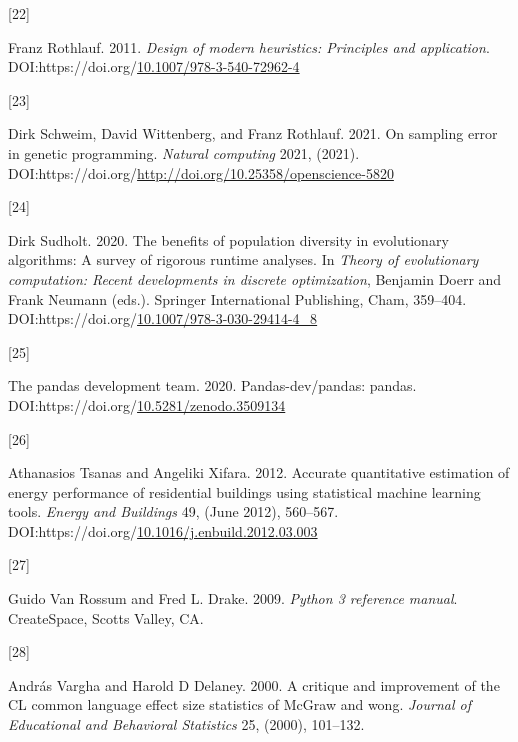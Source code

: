\documentclass[
  11pt,
]{article}
\newlength{\cslhangindent}
\newlength{\csllabelwidth}
\newlength{\cslentryspacingunit} %
\newenvironment{CSLReferences}[2] %
 {%
  \setlength{\parindent}{0pt}
  \ifodd #1
  \let\oldpar\par
  \def\par{\hangindent=\cslhangindent\oldpar}
  \fi
  \setlength{\parskip}{#2\cslentryspacingunit}
 }%
 {}
\newcommand{\CSLLeftMargin}[1]{\parbox[t]{\csllabelwidth}{#1}}
\newcommand{\CSLRightInline}[1]{\parbox[t]{\linewidth - \csllabelwidth}{#1}\break}
\begin{document}
\begin{CSLReferences}{0}{0}
\leavevmode{}%
\CSLLeftMargin{{[}22{]} }%
\CSLRightInline{Franz Rothlauf. 2011. \emph{Design of modern heuristics: Principles and application}. DOI:https://doi.org/\href{https://doi.org/10.1007/978-3-540-72962-4}{10.1007/978-3-540-72962-4}}

\leavevmode{}%
\CSLLeftMargin{{[}23{]} }%
\CSLRightInline{Dirk Schweim, David Wittenberg, and Franz Rothlauf. 2021. On sampling error in genetic programming. \emph{Natural computing} 2021, (2021). DOI:https://doi.org/\url{http://doi.org/10.25358/openscience-5820}}

\leavevmode{}%
\CSLLeftMargin{{[}24{]} }%
\CSLRightInline{Dirk Sudholt. 2020. The benefits of population diversity in evolutionary algorithms: A survey of rigorous runtime analyses. In \emph{Theory of evolutionary computation: Recent developments in discrete optimization}, Benjamin Doerr and Frank Neumann (eds.). Springer International Publishing, Cham, 359--404. DOI:https://doi.org/\href{https://doi.org/10.1007/978-3-030-29414-4_8}{10.1007/978-3-030-29414-4\_8}}

\leavevmode{}%
\CSLLeftMargin{{[}25{]} }%
\CSLRightInline{The pandas development team. 2020. Pandas-dev/pandas: pandas. DOI:https://doi.org/\href{https://doi.org/10.5281/zenodo.3509134}{10.5281/zenodo.3509134}}

\leavevmode{}%
\CSLLeftMargin{{[}26{]} }%
\CSLRightInline{Athanasios Tsanas and Angeliki Xifara. 2012. Accurate quantitative estimation of energy performance of residential buildings using statistical machine learning tools. \emph{Energy and Buildings} 49, (June 2012), 560--567. DOI:https://doi.org/\href{https://doi.org/10.1016/j.enbuild.2012.03.003}{10.1016/j.enbuild.2012.03.003}}

\leavevmode{}%
\CSLLeftMargin{{[}27{]} }%
\CSLRightInline{Guido Van Rossum and Fred L. Drake. 2009. \emph{Python 3 reference manual}. CreateSpace, Scotts Valley, CA.}

\leavevmode{}%
\CSLLeftMargin{{[}28{]} }%
\CSLRightInline{András Vargha and Harold D Delaney. 2000. A critique and improvement of the CL common language effect size statistics of McGraw and wong. \emph{Journal of Educational and Behavioral Statistics} 25, (2000), 101--132.}


\end{CSLReferences}
\end{document}
